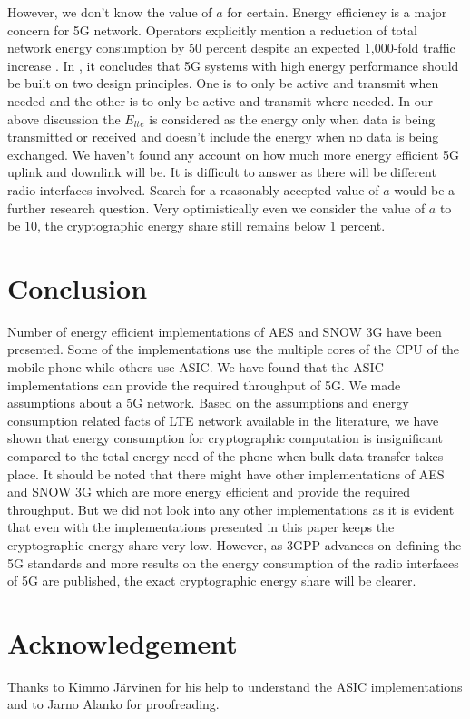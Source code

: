 \documentclass[12pt]{llncs}
\begin{document}
However, we don't know the value of $a$ for certain. Energy efficiency is a major concern for 5G network. Operators explicitly mention a reduction of total network energy consumption by 50 percent despite an expected 1,000-fold traffic increase \cite{NGMN_Whie_Paper}. In \cite{Ericsson_white_paper_energy}, it concludes that 5G systems with high energy performance should be built on two design principles. One is to only be active and transmit when needed and the other is to only be active and transmit where needed. In our above discussion the $E_{lte}$ is considered as the energy only when data is being transmitted or received and doesn't include the energy when no data is being exchanged. We haven't found any account on how much more energy efficient 5G uplink and downlink will be. It is difficult to answer as there will be different radio interfaces involved. Search for a reasonably accepted value of $a$ would be a further research question. Very optimistically even we consider the value of $a$ to be $10$, the cryptographic energy share still remains below $1$ percent.

\section{Conclusion}
\label{sec:conclusion}
Number of energy efficient implementations of AES and SNOW 3G have been presented. Some of the implementations use the multiple cores of the CPU of the mobile phone while others use ASIC. We have found that the ASIC implementations can provide the required throughput of 5G. We made assumptions about a 5G network. Based on the assumptions and energy consumption related facts of LTE network available in the literature, we have shown that energy consumption for cryptographic computation is insignificant compared to the total energy need of the phone when bulk data transfer takes place. It should be noted that there might have other implementations of AES and SNOW 3G which are more energy efficient and provide the required throughput. But we did not look into any other implementations as it is evident that even with the implementations presented in this paper keeps the cryptographic energy share very low. However, as 3GPP advances on defining the 5G standards and more results on the energy consumption of the radio interfaces of 5G are published, the exact cryptographic energy share will be clearer.
\section{Acknowledgement}
\label{sec:acknowledgement}
Thanks to Kimmo J{\"a}rvinen for his help to understand the ASIC implementations and to Jarno Alanko for proofreading.
\end{document}
